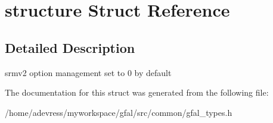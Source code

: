 \section{structure Struct Reference}
\label{structstructure}


\subsection{Detailed Description}
srmv2 option management set to 0 by default 



The documentation for this struct was generated from the following file:\begin{CompactItemize}
\item 
/home/adevress/myworkspace/gfal/src/common/gfal\_\-types.h\end{CompactItemize}
